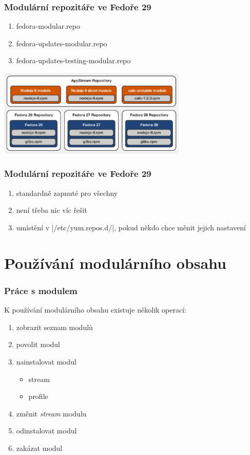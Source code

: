 \documentclass[12pt]{beamer}
\begin{document}
\begin{frame}
\frametitle{Modulární repozitáře ve Fedoře 29}

\begin{enumerate}
	\item fedora-modular.repo
	\item fedora-updates-modular.repo
	\item fedora-updates-testing-modular.repo
\end{enumerate}

\begin{center}
	\includegraphics[width=9cm]{repos}
\end{center}
\end{frame}

\begin{frame}[fragile]
\frametitle{Modulární repozitáře ve Fedoře 29}

\begin{enumerate}
	\item standardně zapnuté pro všechny
	\item není třeba nic víc řešit
 	\item umístění v \tc|/etc/yum.repos.d/|, pokud někdo chce měnit jejich nastavení
\end{enumerate}
\end{frame}

\section{Používání modulárního obsahu}

\begin{frame}
\frametitle{Práce s modulem}

K používání modulárního obsahu existuje několik operací:

\begin{enumerate}
	\item zobrazit seznam modulů
	\item povolit modul
	\item nainstalovat modul
	\begin{itemize}
		\item stream
		\item profile
	\end{itemize}
	\item změnit \textit{stream} modulu
	\item odinstalovat modul
	\item zakázat modul
\end{enumerate}
\end{frame}
\end{document}

